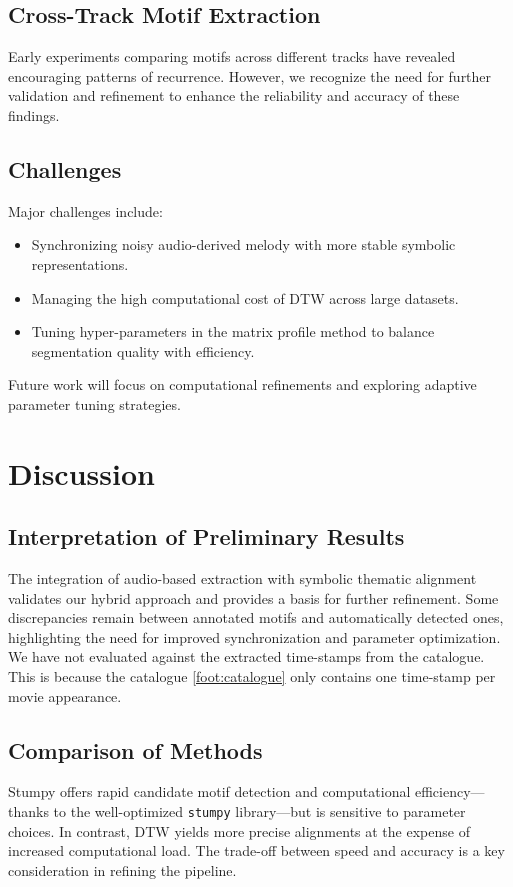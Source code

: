 \documentclass[conference]{IEEEtran}
\begin{document}
\subsection{Cross-Track Motif Extraction}
Early experiments comparing motifs across different tracks have revealed encouraging patterns of recurrence. However, we recognize the need for further validation and refinement to enhance the reliability and accuracy of these findings.

\subsection{Challenges}
Major challenges include:
\begin{itemize}
    \item Synchronizing noisy audio-derived melody with more stable symbolic representations.
    \item Managing the high computational cost of DTW across large datasets.
    \item Tuning hyper-parameters in the matrix profile method to balance segmentation quality with efficiency.
\end{itemize}
Future work will focus on computational refinements and exploring adaptive parameter tuning strategies.

\section{Discussion}

\subsection{Interpretation of Preliminary Results}
The integration of audio-based extraction with symbolic thematic alignment validates our hybrid approach and provides a basis for further refinement. Some discrepancies remain between annotated motifs and automatically detected ones, highlighting the need for improved synchronization and parameter optimization.
We have not evaluated against the extracted time-stamps from the catalogue. This is because the catalogue \ref{foot:catalogue} only contains one time-stamp per movie appearance.

\subsection{Comparison of Methods}
Stumpy offers rapid candidate motif detection and computational efficiency—thanks to the well-optimized \texttt{stumpy} library—but is sensitive to parameter choices. In contrast, DTW yields more precise alignments at the expense of increased computational load. The trade-off between speed and accuracy is a key consideration in refining the pipeline.
\end{document}
